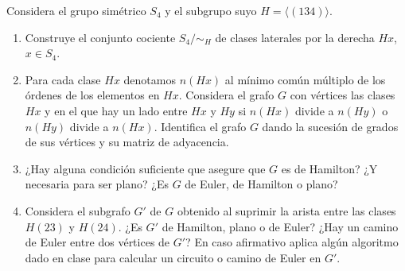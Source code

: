 \begin{ejercicio}\label{ej:1.41}
    Considera el grupo simétrico $S_4$ y el subgrupo suyo $H = \langle (1 3 4) \rangle$.
    \begin{enumerate}
        \item Construye el conjunto cociente $S_4/\sim_H$ de clases laterales por la derecha $Hx$, $x \in S_4$.
        \item Para cada clase $Hx$ denotamos $n(Hx)$ al mínimo común múltiplo de los órdenes de los elementos en $Hx$. Considera el grafo $G$ con vértices las clases $Hx$ y en el que hay un lado entre $Hx$ y $Hy$ si $n(Hx)$ divide a $n(Hy)$ o $n(Hy)$ divide a $n(Hx)$. Identifica el grafo $G$ dando la sucesión de grados de sus vértices y su matriz de adyacencia.
        \item ¿Hay alguna condición suficiente que asegure que $G$ es de Hamilton? ¿Y necesaria para ser plano? ¿Es $G$ de Euler, de Hamilton o plano?
        \item Considera el subgrafo $G'$ de $G$ obtenido al suprimir la arista entre las clases $H(2 3)$ y $H(2 4)$. ¿Es $G'$ de Hamilton, plano o de Euler? ¿Hay un camino de Euler entre dos vértices de $G'$? En caso afirmativo aplica algún algoritmo dado en clase para calcular un circuito o camino de Euler en $G'$.
    \end{enumerate}
\end{ejercicio}